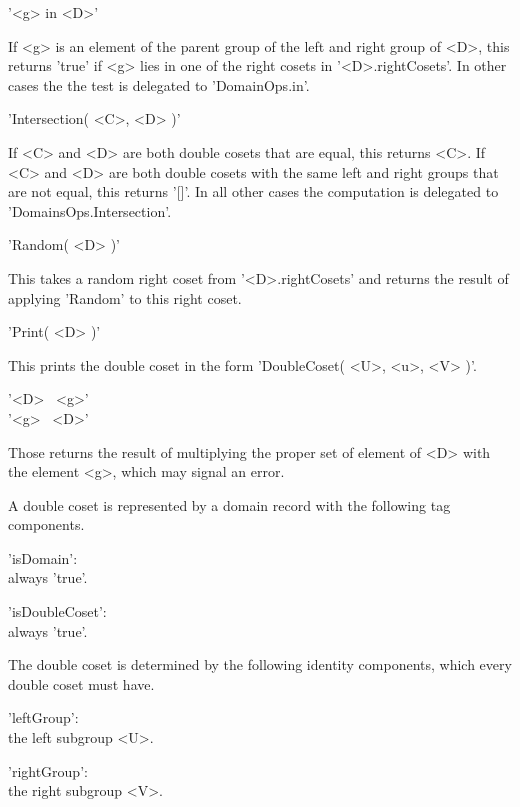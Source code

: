 \vspace{5mm}
'<g> in <D>'

If <g> is an element of the parent group  of the left  and right group of
<D>, this returns  'true' if <g>   lies  in one of  the  right  cosets in
'<D>.rightCosets'.   In    other cases the  the    test is   delegated to
'DomainOps.in'.

\vspace{5mm}
'Intersection( <C>, <D> )'%

If <C> and <D> are both double  cosets that are equal, this  returns <C>.
If <C> and <D> are both double cosets with the same left and right groups
that  are  not  equal,  this  returns  '[]'.   In  all  other  cases  the
computation is delegated to 'DomainsOps.Intersection'.

\vspace{5mm}
'Random( <D> )'%

This takes a  random right coset from '<D>.rightCosets'  and returns  the
result of applying 'Random' to this right coset.

\vspace{5mm}
'Print( <D> )'%

This prints the double coset in the form 'DoubleCoset( <U>, <u>, <V> )'.

\vspace{5mm}
'<D> \*\ <g>'%
\\
'<g> \*\ <D>'

Those returns the result of multiplying the proper  set of element of <D>
with the element <g>, which may signal an error.

%

A double coset is  represented by a  domain record with the following tag
components.

'isDomain': \\
        always 'true'.

'isDoubleCoset': \\
        always 'true'.

The  double coset  is determined by  the following  identity  components,
which every double coset must have.

'leftGroup': \\
        the left subgroup <U>.

'rightGroup': \\
        the right subgroup <V>.

